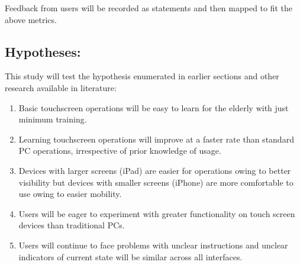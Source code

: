 \documentclass[12pt,draftcls,onecolumn]{IEEEtran}
\begin{document}
Feedback from users will be recorded as statements and then mapped to fit the above metrics.

\subsection{Hypotheses:}

This study will test the hypothesis enumerated in earlier sections and other research\cite{kobayashi2011elderly} available in literature:

\begin{enumerate}
  \item Basic touchscreen operations will be easy to learn for the elderly with just minimum training.
  \item Learning touchscreen operations will improve at a faster rate than standard PC operations, irrespective of prior knowledge of usage.
  \item Devices with larger screens (iPad) are easier for operations owing to better visibility but devices with smaller screens (iPhone) are more comfortable to use owing to easier mobility.
  \item Users will be eager to experiment with greater functionality on touch screen devices than traditional PCs.  
  \item Users will continue to face problems with unclear instructions and unclear indicators of current state will be similar across all interfaces.
  
\end{enumerate}

%
%




\end{document}
